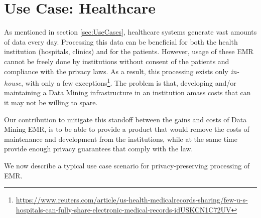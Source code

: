 
\section{Use Case: Healthcare}
\label{}


As mentioned in section \ref{sec:UseCases}, healthcare systems generate vast amounts of data every day. Processing this data can be beneficial for both the health institution (hospitals, clinics) and for the patients. However, usage of these \ac{EMR} cannot be freely done by institutions without consent of the patients and compliance with the privacy laws. As a result, this processing exists only \textit{in-house}, with only a few exceptions\footnote{\url{https://www.reuters.com/article/us-health-medicalrecords-sharing/few-u-s-hospitals-can-fully-share-electronic-medical-records-idUSKCN1C72UV}}. The problem is that, developing and/or maintaining a Data Mining infrastructure in an institution amass costs that can it may not be willing to spare.

Our contribution to mitigate this standoff between the gains and costs of Data Mining \ac{EMR}, is to be able to provide a product that would remove the costs of maintenance and development from the institutions, while at the same time provide enough privacy guarantees that comply with the law.


We now describe a typical use case scenario for privacy-preserving processing of \ac{EMR}.

